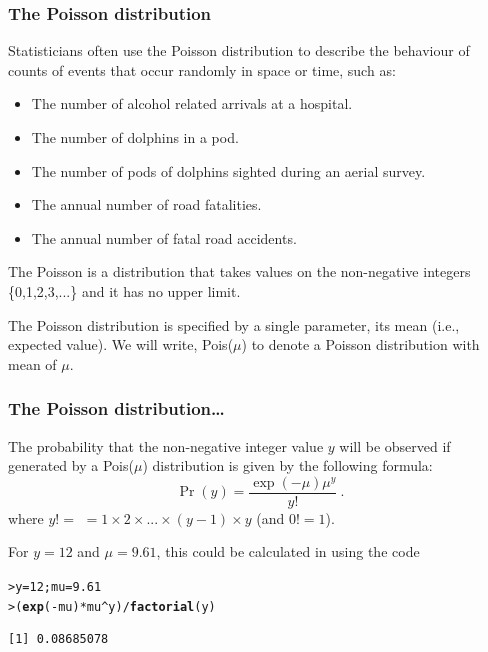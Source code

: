 \documentclass{beamer}\usepackage[]{graphicx}\usepackage[]{xcolor}
\makeatletter
\newcommand{\hlnum}[1]{\textcolor[rgb]{0.686,0.059,0.569}{#1}}%
\newcommand{\hlopt}[1]{\textcolor[rgb]{0,0,0}{#1}}%
\newcommand{\hlstd}[1]{\textcolor[rgb]{0.345,0.345,0.345}{#1}}%
\newcommand{\hlkwb}[1]{\textcolor[rgb]{0.69,0.353,0.396}{#1}}%
\newcommand{\hlkwd}[1]{\textcolor[rgb]{0.737,0.353,0.396}{\textbf{#1}}}%
\newenvironment{kframe}{%
 \def\at@end@of@kframe{}%
 \ifinner\ifhmode%
  \def\at@end@of@kframe{\end{minipage}}%
  \begin{minipage}{\columnwidth}%
 \fi\fi%
 \def\FrameCommand##1{\hskip\@totalleftmargin \hskip-\fboxsep
 \colorbox{shadecolor}{##1}\hskip-\fboxsep
     \hskip-\linewidth \hskip-\@totalleftmargin \hskip\columnwidth}%
 \MakeFramed {\advance\hsize-\width
   \@totalleftmargin\z@ \linewidth\hsize
   \@setminipage}}%
 {\par\unskip\endMakeFramed%
 \at@end@of@kframe}
\newenvironment{knitrout}{}{} %
\makeatother
\begin{document}



\begin{frame}[fragile]
\frametitle{The Poisson distribution}
Statisticians often use the Poisson distribution to describe the behaviour of counts of events that occur randomly in space or time, such as:
\medskip

\begin{itemize}
\item The number of alcohol related arrivals at a hospital.

\item The number of dolphins in a pod.

\item The number of pods of dolphins sighted during an aerial survey.

\item The annual number of road fatalities.

\item The annual number of fatal road accidents.
\end{itemize}
\bigskip

The Poisson is a distribution that takes values on the non-negative integers
\{0,1,2,3,...\} and it has no upper limit.
\bigskip

The Poisson distribution is specified by a single parameter, its mean (i.e., expected value).
We will write, Pois($\mu$) to denote a Poisson distribution with mean of $\mu$.
\end{frame}



\begin{frame}[fragile]
\frametitle{The Poisson distribution\ldots}
The probability that the non-negative integer value $y$ will be observed if generated
by a Pois($\mu$) distribution is given by the following formula:
\[
\Pr(y)=\frac{\exp(-\mu)\mu^y}{y!} \ .
\]
where $y!=$  $=1 \times 2 \times ... \times (y-1) \times y$
(and $0!=1$).
\bigskip

For $y=12$ and $\mu=9.61$, this could be calculated in  using the code

\begin{knitrout}\scriptsize
{}\color{fgcolor}\begin{kframe}
\begin{alltt}
\hlstd{> }\hlstd{y}\hlkwb{=}\hlnum{12}\hlstd{; mu}\hlkwb{=}\hlnum{9.61}
\hlstd{> }\hlstd{(}\hlkwd{exp}\hlstd{(}\hlopt{-}\hlstd{mu)}\hlopt{*}\hlstd{mu}\hlopt{^}\hlstd{y)}\hlopt{/}\hlkwd{factorial}\hlstd{(y)}
\end{alltt}
\begin{verbatim}
[1] 0.08685078
\end{verbatim}
\end{kframe}
\end{knitrout}
\end{frame}
\end{document}
